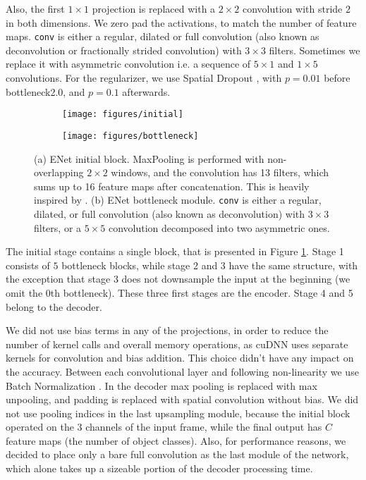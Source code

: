 \documentclass{article}
\begin{document}
Also, the first $1 \times 1$ projection is replaced with a $2 \times 2$ convolution with stride $2$ in both dimensions.
We zero pad the activations, to match the number of feature maps.
\texttt{conv} is either a regular, dilated or full convolution (also known as deconvolution or fractionally strided convolution) with $3 \times 3$ filters. Sometimes we replace it with asymmetric convolution i.e. a sequence of $5 \times 1$ and $1 \times 5$ convolutions.
For the regularizer, we use Spatial Dropout \cite{tompson15}, with $p = 0.01$ before bottleneck2.0, and $p = 0.1$ afterwards.

\begin{figure}[!t]
\begin{subfigure}{.5\textwidth}
  \centering
  \texttt{[image: figures/initial]}
  \\
  \caption{}
  \label{fig:initial}
\end{subfigure}\begin{subfigure}{.5\textwidth}
  \centering
  \texttt{[image: figures/bottleneck]}
  \caption{}
  \label{fig:bottleneck}
\end{subfigure}
  \vspace{0.05in}
  \caption{
          (a) ENet initial block. MaxPooling is performed with non-overlapping $2 \times 2$ windows, and the convolution has 13 filters, which sums up to 16 feature maps after concatenation. This is heavily inspired by \cite{szegedy2015rethinking}.
          (b) ENet bottleneck module. \texttt{conv} is either a regular, dilated, or full convolution (also known as deconvolution) with $3 \times 3$ filters, or a $5 \times 5$ convolution decomposed into two asymmetric ones.}
\label{fig:modules}
\end{figure}

The initial stage contains a single block, that is presented in Figure \ref{fig:initial}.
Stage 1 consists of $5$ bottleneck blocks, while stage 2 and 3 have the same structure, with the exception that stage 3 does not downsample the input at the beginning (we omit the $0$th bottleneck). These three first stages are the encoder. Stage 4 and 5 belong to the decoder.

We did not use bias terms in any of the projections, in order to reduce the number of kernel calls and overall memory operations, as cuDNN \cite{chetlur2014cudnn} uses separate kernels for convolution and bias addition.
This choice didn't have any impact on the accuracy.
Between each convolutional layer and following non-linearity we use Batch Normalization \cite{ioffe2015batchnorm}.
In the decoder max pooling is replaced with max unpooling, and padding is replaced with spatial convolution without bias.
We did not use pooling indices in the last upsampling module, because the initial block operated on the $3$ channels of the input frame, while the final output has $C$ feature maps (the number of object classes).
Also, for performance reasons, we decided to place only a bare full convolution as the last module of the network, which alone takes up a sizeable portion of the decoder processing time.
\end{document}
